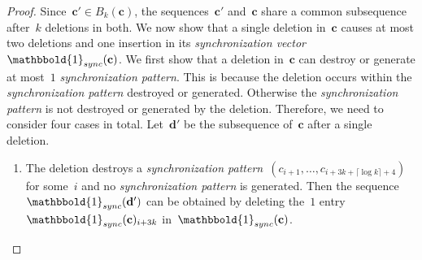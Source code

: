 \documentclass[10pt,a4paper,onecolumn]{IEEEtran}
\newcommand{\1}{\mathbbold{1}}
\newcommand{\boldc}{\mathbf{c}}
\newcommand{\boldd}{\mathbf{d}}
\begin{document}
\begin{proof}
Since~$\boldc'\in B_k(\boldc)$, the sequences~$\boldc'$ and~$\boldc$ share a common subsequence after~$k$ deletions in both. We now show that a single deletion in~$\boldc$ causes at most two deletions and one insertion in its \emph{synchronization vector}~$\1_{sync}(\boldc)$. 
We first show that a deletion in~$\boldc$ can destroy or generate at most~$1$ \emph{synchronization pattern}. This is because the deletion occurs within the \emph{synchronization pattern} destroyed or generated. Otherwise the \emph{synchronization pattern} is not destroyed or generated by the deletion.
Therefore, we need to consider four cases in total. Let~$\boldd'$ be the subsequence of~$\boldc$ after a single deletion.
\begin{enumerate}
\item The deletion destroys a \emph{synchronization pattern}~$(c_{i+1},\ldots,c_{i+3k+\lceil \log k\rceil +4})$ for some~$i$ and no \emph{synchronization pattern} is generated. Then the sequence~$\1_{sync}(\boldd')$ can be obtained by deleting the~$1$ entry~$\1_{sync}(\boldc)_{i+3k}$ in~$\1_{sync}(\boldc)$.

\end{enumerate}
\end{proof}
\end{document}
